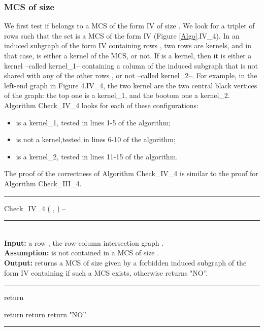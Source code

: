 \documentclass{article}
\begin{document}
\subsubsection{MCS of size }

We first test if  belongs to a MCS of the form IV of size .
We look for a triplet of rows  such that 
the set  is a MCS of the form IV (Figure \ref{Algo}.IV\_4).
In an induced subgraph of the form IV containing  rows  , 
two rows are kernels, and in that case,  is either a kernel of the MCS, 
or not. If  is a kernel, then it is either a kernel --called kernel\_1-- 
containing a column of the induced subgraph that is not shared with any 
of the other rows , or not --called kernel\_2--. For example, in the 
left-end graph in Figure 4.IV\_4, the two kernel are the two central black
vertices of the graph: the top one is a kernel\_1, and the bootom one a
 kernel\_2.
Algorithm \mbox{Check\_IV\_4} looks for each of these configurations: 
\begin{itemize}
\item   is a kernel\_1, tested in lines 1-5 of the algorithm;  
\item  is not a kernel,tested in lines 6-10 of the algorithm; 
\item  is a kernel\_2, tested in lines 11-15 of the algorithm.
\end{itemize}
The proof of the correctness of Algorithm \mbox{Check\_IV\_4} is similar to the
proof for Algorithm \mbox{Check\_III\_4}.

\begin{algorithm}[htpb]                      
\rule{11.7cm}{0.01cm}

\caption{Check\_IV\_4 ( , ) -- } 
\rule{11.7cm}{0.01cm}
\\
{\bf Input:} a row , the row-column intersection graph .\\
{\bf Assumption:}   is not contained in a MCS of size .\\
{\bf Output:} returns a MCS  of size  given by a forbidden 
induced subgraph of the form IV containing  if such a MCS exists, otherwise returns  "NO''.
\rule{11.7cm}{0.01cm}

\begin{algorithmic}[1]
\STATE return 
\ENDIF
\ENDFOR 

\STATE return 
\ENDIF
\ENDFOR 
{}
\STATE return 
\ENDIF
\ENDFOR 
\STATE return "NO''

\end{algorithmic}
\rule{11.7cm}{0.01cm}
\end{algorithm}
\end{document}
